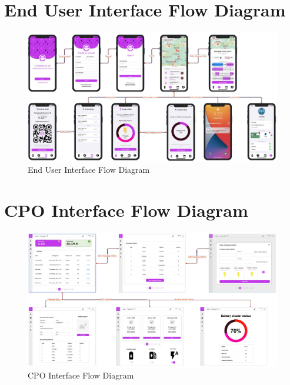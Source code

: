\section{End User Interface Flow Diagram}
\begin{figure}[H]
    \centering
    \includegraphics[width=\textwidth]{images/EndUserFlowDiagram.png}
    \caption{End User Interface Flow Diagram}
    \label{fig:EndUserFlowDiagram}
\end{figure}
\section{CPO Interface Flow Diagram}
\begin{figure}[H]
    \centering
    \includegraphics[width=\textwidth]{images/CPOflowDiagram.png}
    \caption{CPO Interface Flow Diagram}
    \label{fig:CPOFlowDiagram}
\end{figure}